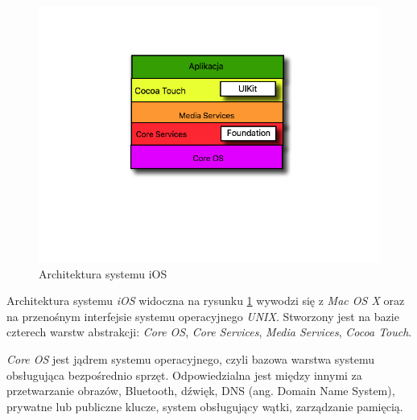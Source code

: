 \documentclass{iiuwb}
\begin{document}
\begin{figure}[!th]
\centering
\includegraphics[scale=.5]{image/ArchitekturaiOS.jpg}
\caption{Architektura systemu iOS}
\label{fig:Architektura iOS}
\end{figure}
Architektura systemu \textit{iOS}  widoczna na rysunku \ref{fig:Architektura iOS} wywodzi się z \textit{Mac OS X}  oraz na przenośnym interfejsie systemu operacyjnego \textit{UNIX}. Stworzony jest na bazie czterech warstw abstrakcji: \textit{Core OS}, \textit{Core Services}, \textit{Media Services}, \textit{Cocoa Touch}.

\textit{Core OS} jest jądrem systemu operacyjnego, czyli bazowa warstwa systemu obsługująca bezpośrednio sprzęt. Odpowiedzialna jest między innymi za przetwarzanie obrazów, Bluetooth, dźwięk, DNS (ang. Domain Name System), prywatne lub publiczne klucze, system obsługujący wątki, zarządzanie pamięcią.
\end{document}
